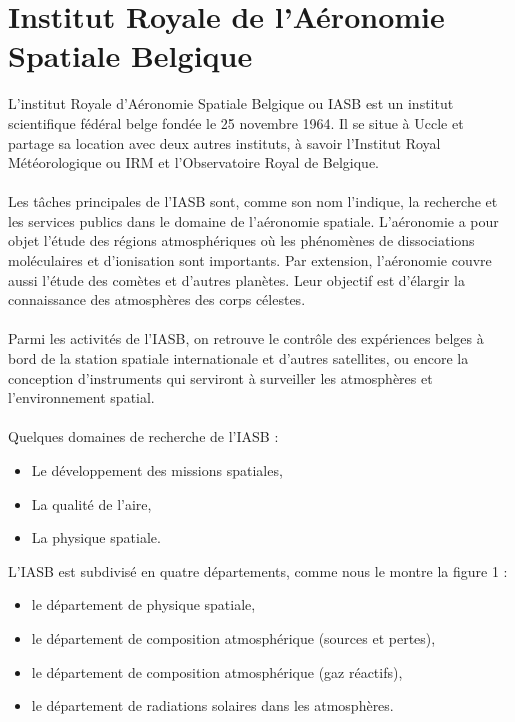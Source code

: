 \documentclass[11pt]{article}
\begin{document}
\section{Institut Royale de l'Aéronomie Spatiale Belgique}
L'institut Royale d'Aéronomie Spatiale Belgique ou IASB est un institut scientifique fédéral belge fondée le 25 novembre 1964.
Il se situe à Uccle et partage sa location avec deux autres instituts, à savoir l'Institut Royal Météorologique ou IRM et l'Observatoire Royal de Belgique.\\
\\
Les tâches principales de l'IASB sont, comme son nom l'indique, la recherche et les services publics dans le domaine de l'aéronomie spatiale.
L'aéronomie a pour objet l'étude des régions atmosphériques où les phénomènes de dissociations moléculaires et d'ionisation sont importants.
Par extension, l'aéronomie couvre aussi l'étude des comètes et d'autres planètes.
Leur objectif est d'élargir la connaissance des atmosphères des corps célestes.\\
\\
Parmi les activités de l'IASB, on retrouve le contrôle des expériences belges à bord de la station spatiale internationale et d'autres satellites, ou encore la conception d'instruments qui serviront à surveiller les atmosphères et l'environnement spatial.\\
\\
Quelques domaines de recherche de l'IASB :
\begin{itemize}[noitemsep]
    \item Le développement des missions spatiales,
    \item La qualité de l'aire,
    \item La physique spatiale.
\end{itemize}
\vspace{10pt}
L'IASB est subdivisé en quatre départements, comme nous le montre la figure 1 :
\begin{itemize}[noitemsep]
    \item le département de physique spatiale,
    \item le département de composition atmosphérique (sources et pertes),
    \item le département de composition atmosphérique (gaz réactifs),
    \item le département de radiations solaires dans les atmosphères.
\end{itemize}
\vspace{3pt}
\end{document}

